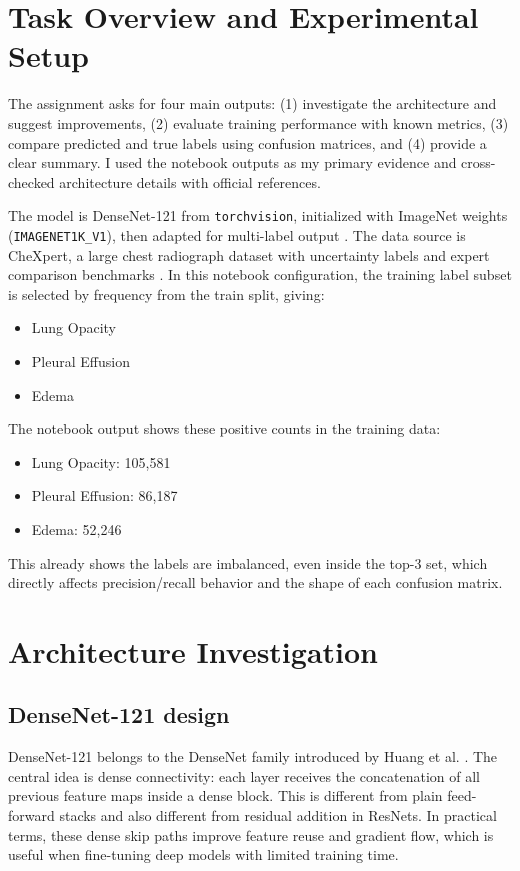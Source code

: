 \documentclass[12pt]{article}
\begin{document}
\section{Task Overview and Experimental Setup}
The assignment asks for four main outputs: (1) investigate the architecture and suggest improvements, (2) evaluate training performance with known metrics, (3) compare predicted and true labels using confusion matrices, and (4) provide a clear summary. I used the notebook outputs as my primary evidence and cross-checked architecture details with official references.

The model is DenseNet-121 from \texttt{torchvision}, initialized with ImageNet weights (\texttt{IMAGENET1K\_V1}), then adapted for multi-label output \citep{torchvision_densenet121}. The data source is CheXpert, a large chest radiograph dataset with uncertainty labels and expert comparison benchmarks \citep{irvin2019chexpert,chexpert_site}. In this notebook configuration, the training label subset is selected by frequency from the train split, giving:
\begin{itemize}
    \item Lung Opacity
    \item Pleural Effusion
    \item Edema
\end{itemize}

The notebook output shows these positive counts in the training data:
\begin{itemize}
    \item Lung Opacity: 105,581
    \item Pleural Effusion: 86,187
    \item Edema: 52,246
\end{itemize}
This already shows the labels are imbalanced, even inside the top-3 set, which directly affects precision/recall behavior and the shape of each confusion matrix.

\section{Architecture Investigation}
\subsection{DenseNet-121 design}
DenseNet-121 belongs to the DenseNet family introduced by Huang et al. \citep{huang2018densenet}. The central idea is dense connectivity: each layer receives the concatenation of all previous feature maps inside a dense block. This is different from plain feed-forward stacks and also different from residual addition in ResNets. In practical terms, these dense skip paths improve feature reuse and gradient flow, which is useful when fine-tuning deep models with limited training time.
\end{document}
